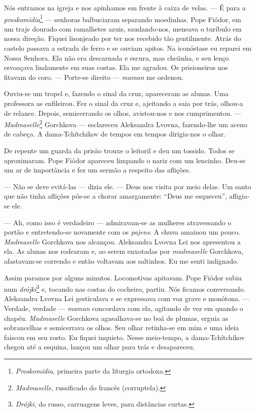 Nós entramos na igreja e nos apinhamos em frente à caixa de velas. --- É
para a \emph{proskomidia}\footnote{\emph{Proskomidia}, primeira parte da
  liturgia ortodoxa.} --- senhoras balbuciaram separando moedinhas. Pope
Fiódor, em um traje dourado com ramalhetes azuis, saudando-nos, meneava
o turíbulo em nossa direção. Fiquei lisonjeado por ter nos recebido tão
gentilmente. Atrás do castelo passava a estrada de ferro e se ouviam
apitos. Na iconóstase eu reparei em Nossa Senhora. Ela não era
descarnada e escura, mas cheiinha, e seu lenço esvoaçava lindamente em
suas costas. Ela me agradou. Os prisioneiros nos fitavam do coro. ---
Porte-se direito --- \emph{maman} me ordenou.

Ouviu-se um tropel e, fazendo o sinal da cruz, apareceram as alunas. Uma
professora as enfileirou. Fez o sinal da cruz e, ajeitando a saia por
trás, olhou-a de relance. Depois, semicerrando os olhos, avistou-nos e
nos cumprimentou. --- \emph{Madmaselle}\footnote{\emph{Madmaselle},
  russificado do francês (corruptela).} Gorchkova --- esclareceu
Aleksandra Lvovna, fazendo-lhe um aceno de cabeça. A dama-Tchítchikov de
tempos em tempos dirigia-nos o olhar.

De repente um guarda da prisão trouxe o leitoril e deu um tossido. Todos
se aproximaram. Pope Fiódor apareceu limpando o nariz com um lencinho.
Deu-se um ar de importância e fez um sermão a respeito das aflições.

--- Não se deve evitá-las --- dizia ele. --- Deus nos visita por meio
delas. Um santo que não tinha aflições pôs-se a chorar amargamente:
``Deus me esqueceu'', afligia-se ele.

--- Ah, como isso é verdadeiro --- admiravam-se as mulheres atravessando
o portão e entretendo-se novamente com os \emph{pajens}. A chuva amainou
um pouco. \emph{Madmaselle} Gorchkova nos alcançou. Aleksandra Lvovna
Lei nos apresentou a ela. As alunas nos rodearam e, ao serem enxotadas
por \emph{madmaselle} Gorchkova, afastavam-se correndo e então voltavam
aos saltinhos. Eu me senti indignado.

Assim paramos por alguns minutos. Locomotivas apitavam. Pope Fiódor
subiu num \emph{drójki}\footnote{\emph{Drójki}, do russo, carruagens
  leves, para distâncias curtas.} e, tocando nas costas do cocheiro,
partiu. Nós ficamos conversando. Aleksandra Lvovna Lei gesticulava e se
expressava com voz grave e monótona. --- Verdade, verdade ---
\emph{maman} concordava com ela, agitando de vez em quando o chapéu.
\emph{Madmaselle} Gorchkova agasalhava-se no boá de plumas, erguia as
sobrancelhas e semicerrava os olhos. Seu olhar retinha-se em mim e uma
ideia faiscou em seu rosto. Eu fiquei inquieto. Nesse meio-tempo, a
dama-Tchítchikov chegou até a esquina, lançou um olhar para trás e
desapareceu.

